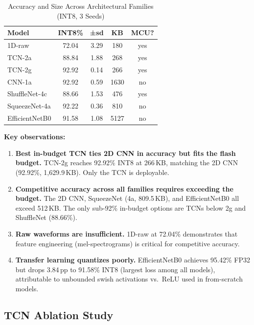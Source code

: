 \documentclass[conference]{IEEEtran}
\begin{document}
\begin{table}[h]
\centering
\caption{Accuracy and Size Across Architectural Families (INT8, 3 Seeds)}
\small
\begin{tabular}{lcccc}
\toprule
\textbf{Model} & \textbf{INT8\%} & \textbf{±sd} & \textbf{KB} & \textbf{MCU?} \\
\midrule
1D-raw & 72.04 & 3.29 & 180 & yes \\
TCN-2a & 88.84 & 1.88 & 268 & yes \\
TCN-2g & 92.92 & 0.14 & 266 & yes \\
CNN-1a & 92.92 & 0.59 & 1630 & no \\
ShuffleNet-4c & 88.66 & 1.53 & 476 & yes \\
SqueezeNet-4a & 92.22 & 0.36 & 810 & no \\
EfficientNetB0 & 91.58 & 1.08 & 5127 & no \\
\bottomrule
\end{tabular}
\label{tab:main}
\end{table}

\textbf{Key observations:}
\begin{enumerate}
  \item \textbf{Best in-budget TCN ties 2D CNN in accuracy but fits the flash budget.} TCN-2g reaches 92.92\% INT8 at 266\,KB, matching the 2D CNN (92.92\%, 1{,}629.9\,KB). Only the TCN is deployable.
  \item \textbf{Competitive accuracy across all families requires exceeding the budget.} The 2D CNN, SqueezeNet (4a, 809.5\,KB), and EfficientNetB0 all exceed 512\,KB. The only sub-92\% in-budget options are TCNs below 2g and ShuffleNet (88.66\%).
  \item \textbf{Raw waveforms are insufficient.} 1D-raw at 72.04\% demonstrates that feature engineering (mel-spectrograms) is critical for competitive accuracy.
  \item \textbf{Transfer learning quantizes poorly.} EfficientNetB0 achieves 95.42\% FP32 but drops 3.84\,pp to 91.58\% INT8 (largest loss among all models), attributable to unbounded swish activations vs.\ ReLU used in from-scratch models.
\end{enumerate}

\subsection{TCN Ablation Study}
\end{document}
